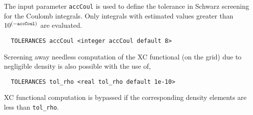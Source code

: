 %

The input
parameter {\tt accCoul} is used to define the tolerance in Schwarz 
screening for the Coulomb integrals.  Only integrals with estimated
values greater than $10^{(-{\tt accCoul})}$ are evaluated.

\begin{verbatim}
  TOLERANCES accCoul <integer accCoul default 8>
\end{verbatim}



Screening away needless computation of the XC functional (on the grid)
due to negligible density is also possible with the use of,
\begin{verbatim}
  TOLERANCES tol_rho <real tol_rho default 1e-10>
\end{verbatim}
XC functional computation is bypassed if the corresponding density
elements are less than \verb+tol_rho+.


